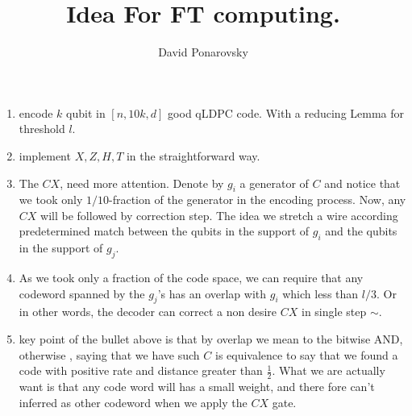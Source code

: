 \documentclass[manuscript,screen,review]{acmart}
\begin{document}

\title{Idea For FT computing.} 
\author{David Ponarovsky}

\begin{enumerate}
  \item encode $k$ qubit in $[n,10k, d]$ good qLDPC code. With a reducing Lemma for threshold $l$.  
  \item implement $X,Z,H,T$ in the straightforward way.  
  \item The $CX$, need more attention. Denote by $g_{i}$ a generator of $C$ and notice that we took only $1/10$-fraction of the generator in the encoding process. Now, any $CX$ will be followed by correction step. The idea we stretch a wire according  predetermined match between the qubits in the support of $g_{i}$ and the qubits in the support of $g_{j}$.    
  \item  As we took only a fraction of the code space, we can require that any codeword spanned by the $g_{j}$'s has an overlap with $g_{i}$ which less than $l/3$. Or in other words, the decoder can correct a non desire $CX$ in single step $\sim$.
  \item key point of the bullet above is that by overlap we mean to the bitwise AND, otherwise , saying that we have such $C$ is equivalence to say that we found a code with positive rate and distance greater than $\frac{1}{2}$. What we are actually want is that any code word will has a small weight, and there fore can't inferred as other codeword when we apply the $CX$ gate.     
\end{enumerate}
\printbibliography
\end{document}
